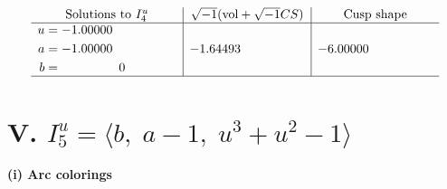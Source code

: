 \documentclass[1p]{elsarticle_modified}
\theoremstyle{definition}
\newcommand{\I}{\sqrt{-1}}
\begin{document}
$$\begin{array}{c|c|c}  
\text{Solutions to }I^u_{4}& \I (\text{vol} + \sqrt{-1}CS) & \text{Cusp shape}\\
 \hline 
\begin{aligned}
u &= -1.00000\phantom{ +0.000000I} \\
a &= -1.00000\phantom{ +0.000000I} \\
b &= \phantom{-0.000000 } 0\end{aligned}
 & -1.64493\phantom{ +0.000000I} & -6.00000\phantom{ +0.000000I}\\
 \hline 
 \end{array}$$\newpage\newpage\renewcommand{\arraystretch}{1}
\centering \section*{V. $I^u_{5}= \langle b,\;a-1,\;u^3+u^2-1 \rangle$}
\flushleft \textbf{(i) Arc colorings}\\
\end{document}
